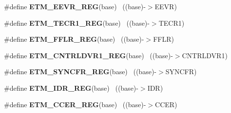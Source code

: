 \begin{DoxyCompactItemize}
\item 
\hypertarget{group___e_t_m___register___accessor___macros_gaf7909133ed79504519ee7750ae2135f9}{}\#define {\bfseries E\+T\+M\+\_\+\+E\+E\+V\+R\+\_\+\+R\+E\+G}(base)                                          ~((base)-\/$>$E\+E\+V\+R)\label{group___e_t_m___register___accessor___macros_gaf7909133ed79504519ee7750ae2135f9}

\item 
\hypertarget{group___e_t_m___register___accessor___macros_ga3572a8d0b81ce0cfd265b19c612f98f3}{}\#define {\bfseries E\+T\+M\+\_\+\+T\+E\+C\+R1\+\_\+\+R\+E\+G}(base)                                        ~((base)-\/$>$T\+E\+C\+R1)\label{group___e_t_m___register___accessor___macros_ga3572a8d0b81ce0cfd265b19c612f98f3}

\item 
\hypertarget{group___e_t_m___register___accessor___macros_ga3d97ceefa1ff8487d539631c08a6e457}{}\#define {\bfseries E\+T\+M\+\_\+\+F\+F\+L\+R\+\_\+\+R\+E\+G}(base)                                          ~((base)-\/$>$F\+F\+L\+R)\label{group___e_t_m___register___accessor___macros_ga3d97ceefa1ff8487d539631c08a6e457}

\item 
\hypertarget{group___e_t_m___register___accessor___macros_ga205ef5ea21e9837e65de15df5cbf6190}{}\#define {\bfseries E\+T\+M\+\_\+\+C\+N\+T\+R\+L\+D\+V\+R1\+\_\+\+R\+E\+G}(base)                                ~((base)-\/$>$C\+N\+T\+R\+L\+D\+V\+R1)\label{group___e_t_m___register___accessor___macros_ga205ef5ea21e9837e65de15df5cbf6190}

\item 
\hypertarget{group___e_t_m___register___accessor___macros_ga572f5065a3fc191ac6090f5c372e0da5}{}\#define {\bfseries E\+T\+M\+\_\+\+S\+Y\+N\+C\+F\+R\+\_\+\+R\+E\+G}(base)                                      ~((base)-\/$>$S\+Y\+N\+C\+F\+R)\label{group___e_t_m___register___accessor___macros_ga572f5065a3fc191ac6090f5c372e0da5}

\item 
\hypertarget{group___e_t_m___register___accessor___macros_ga874f4371095207592c98453a9e1e3b03}{}\#define {\bfseries E\+T\+M\+\_\+\+I\+D\+R\+\_\+\+R\+E\+G}(base)                                            ~((base)-\/$>$I\+D\+R)\label{group___e_t_m___register___accessor___macros_ga874f4371095207592c98453a9e1e3b03}

\item 
\hypertarget{group___e_t_m___register___accessor___macros_gadd83b1f854e39e2d7809cf7b145962b6}{}\#define {\bfseries E\+T\+M\+\_\+\+C\+C\+E\+R\+\_\+\+R\+E\+G}(base)                                          ~((base)-\/$>$C\+C\+E\+R)\label{group___e_t_m___register___accessor___macros_gadd83b1f854e39e2d7809cf7b145962b6}


\end{DoxyCompactItemize}
